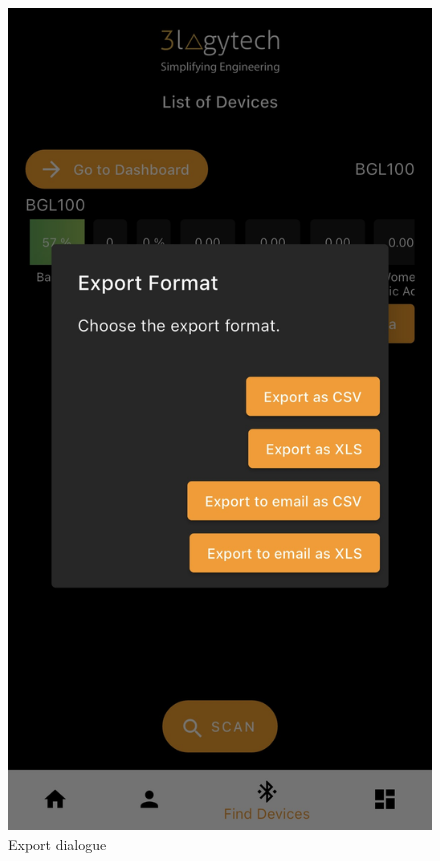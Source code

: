 \documentclass[a4paper]{scrreprt}
\begin{document}
\begin{figure}[htbp]
    \centering
    \includegraphics[scale=0.15]{export_page.jpeg}
    \caption{Export dialogue}
\end{figure}
\clearpage
\end{document}
